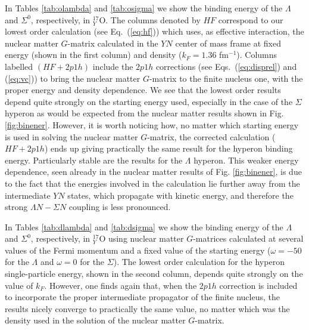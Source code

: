 In Tables \ref{tab:olambda} and \ref{tab:osigma} we show the binding
energy of the $\Lambda$ and $\Sigma^0$, respectively, in $^{17}_Y$O.
The
columns denoted by $HF$ correspond to our lowest order calculation
(see
Eq.~(\ref{eq:hf})) which uses, as effective interaction, the nuclear
matter $G$-matrix calculated in the $YN$ center of mass frame
at fixed energy (shown in the first column) and density ($k_F=1.36$
fm$^{-1}$).
Columns labelled $(HF + 2p1h)$ include the $2p1h$ corrections (see
Eqs.~(\ref{eq:disprel}) and (\ref{eq:vc})) to bring the nuclear
matter $G$-matrix to the finite nucleus one, with the proper
energy
and density dependence. We see that the lowest order results depend
quite strongly on the starting energy used, especially in the case
of the $\Sigma$ hyperon as would be expected from the nuclear matter
results shown in Fig. \ref{fig:binener}. However, it is worth noticing
how,
no matter which
starting energy is used in solving the nuclear matter $G$-matrix, the
corrected
calculation ($HF+2p1h$) ends up giving practically the same result for the
hyperon
binding
energy. Particularly stable are the results for the $\Lambda$ hyperon.
This weaker energy dependence, seen already in the nuclear matter
results of Fig. \ref{fig:binener}, is due to the fact that the energies
involved in the calculation lie further away from the
intermediate $YN$ states, which propagate with kinetic energy,
and therefore the strong $\Lambda N-\Sigma N$ coupling is less
pronounced.

In Tables \ref{tab:dlambda} and \ref{tab:dsigma} we show the binding
energy of the $\Lambda$ and $\Sigma^0$, respectively, in $^{17}_Y$O
using nuclear matter $G$-matrices calculated at several values of the Fermi momentum
and a
fixed value of the starting energy ($\omega=-50$ for the $\Lambda$ and
$\omega=0$ for the $\Sigma$).
The lowest order calculation for the hyperon single-particle energy, shown
in the second column, depends quite strongly on the value of $k_F$.
However, one finds again that, when the $2p1h$ correction is included
to incorporate the proper intermediate propagator of the finite
nucleus, the results nicely converge to practically the same value, no
matter which was the density used in the solution of the nuclear matter
$G$-matrix.

